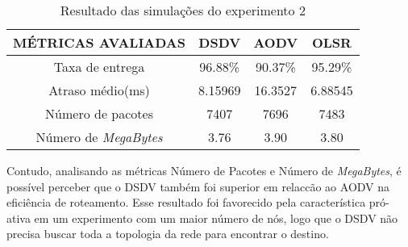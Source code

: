 \begin{table}[H]
	\centering
	\caption{Resultado das simula\c{c}\~oes do experimento 2}
	\begin{tabular}{ | c | c | c | c | }
		\hline
		M\'ETRICAS AVALIADAS & DSDV & AODV & OLSR \\ \hline
		Taxa de entrega & 96.88\% & 90.37\% & 95.29\%  \\ \hline
		Atraso m\'edio(ms) & 8.15969 & 16.3527 & 6.88545  \\ \hline
		N\'umero de pacotes & 7407 & 7696 & 7483  \\ \hline
		N\'umero de \textit{MegaBytes} & 3.76 & 3.90 & 3.80  \\ \hline
	\end{tabular}
	\label{tabExp2Result}
\end{table}

Contudo, analisando as m\'etricas N\'umero de Pacotes e N\'umero de \textit{MegaBytes}, \'e poss\'ivel perceber que o DSDV tamb\'em foi superior em relac{c}\~ao ao AODV na efici\^encia de roteamento.
Esse resultado foi favorecido pela caracter\'istica pr\'o-ativa em um experimento com um maior n\'umero de n\'os, logo que o DSDV n\~ao precisa buscar toda a topologia da rede para encontrar o destino.


